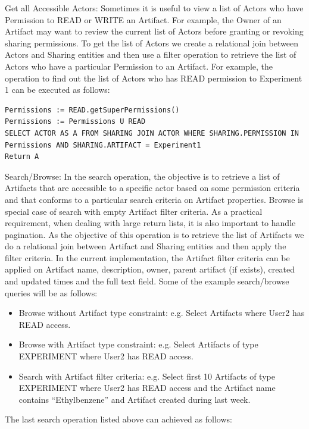 \documentclass[sigconf]{acmart}
\begin{document}
Get all Accessible Actors: Sometimes it is useful to view a list of Actors who have Permission to READ or WRITE an Artifact. For example, the Owner of an Artifact may want to review the current list of Actors before granting or revoking sharing permissions. To get the list of Actors we create a relational join between Actors and Sharing entities and then use a filter operation to retrieve the list of Actors who have a particular Permission to an Artifact. For example, the operation to find out the list of Actors who has READ permission to Experiment 1 can be executed as follows:

\begin{lstlisting}
Permissions := READ.getSuperPermissions()
Permissions := Permissions U READ
SELECT ACTOR AS A FROM SHARING JOIN ACTOR WHERE SHARING.PERMISSION IN Permissions AND SHARING.ARTIFACT = Experiment1
Return A
\end{lstlisting}

Search/Browse: In the search operation, the objective is to retrieve a list of Artifacts that are accessible to a specific actor based on some permission criteria and that conforms to a particular search criteria on Artifact properties. Browse is special case of search with empty Artifact filter criteria. As a practical requirement, when dealing with large return lists, it is also important to handle pagination. As the objective of this operation is to retrieve the list of Artifacts we do a relational join between Artifact and Sharing entities and then apply the filter criteria. In the current implementation, the Artifact filter criteria can be applied on Artifact name, description, owner, parent artifact (if exists), created and updated times and the full text field. Some of the example search/browse queries will be as follows:

\begin{itemize}
\item
Browse without Artifact type constraint: e.g. Select Artifacts where User2 has READ access.
\item
Browse with Artifact type constraint: e.g. Select Artifacts of type EXPERIMENT where User2 has READ access.
\item
Search with Artifact filter criteria: e.g. Select first 10 Artifacts of type EXPERIMENT where User2 has READ access and the Artifact name contains ``Ethylbenzene'' and Artifact created during last week.
\end{itemize}

The last search operation listed above can achieved as follows:
\end{document}
